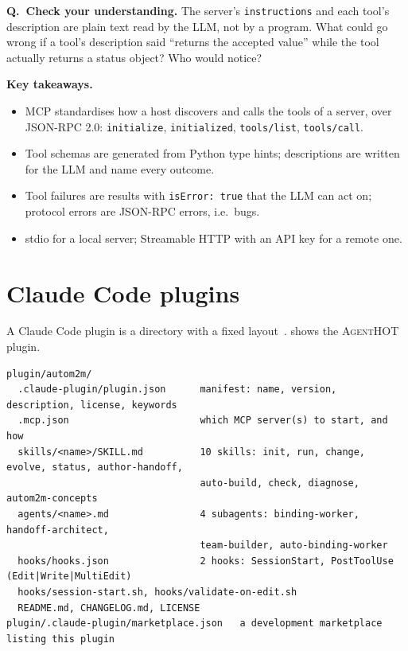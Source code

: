 \documentclass[10pt,a4paper]{article}
\newcommand{\tool}{\textsc{AgentHOT}}
\newcommand{\cc}{Claude Code}
\newcommand{\code}[1]{\texttt{#1}}
\newcommand{\file}[1]{\texttt{#1}}
\newcounter{think}
\newenvironment{think}[1][Check your understanding]{%
  \refstepcounter{think}%
  \begin{tcolorbox}[enhanced, breakable, colback=thinkbg, colframe=thinkbg, arc=0pt, boxrule=0pt,
     borderline west={2.2pt}{0pt}{thinkbar}, left=8pt, right=8pt, top=5pt, bottom=5pt,
     before skip=8pt, after skip=8pt]
  \textsf{\bfseries\color{thinkbar}Q\thethink.\ #1.}\enspace}{\end{tcolorbox}}
\newenvironment{takeaway}{%
  \begin{tcolorbox}[enhanced, breakable, colback=keybg, colframe=keybg, arc=0pt, boxrule=0pt,
     borderline west={2.2pt}{0pt}{keybar}, left=8pt, right=8pt, top=5pt, bottom=5pt,
     before skip=8pt, after skip=8pt]
  \textsf{\bfseries\color{keybar}Key takeaways.}\par\smallskip}{\end{tcolorbox}}
\begin{document}
\begin{think}
The server's \code{instructions} and each tool's description are plain
text read by the LLM, not by a program. What could go wrong if a tool's
description said ``returns the accepted value'' while the tool actually
returns a status object? Who would notice?
\end{think}

\begin{takeaway}
\begin{itemize}
\item MCP standardises how a host discovers and calls the tools of a server,
over JSON-RPC 2.0: \code{initialize}, \code{initialized},
\code{tools/list}, \code{tools/call}.
\item Tool schemas are generated from Python type hints; descriptions are
written for the LLM and name every outcome.
\item Tool failures are results with \code{isError: true} that the LLM can
act on; protocol errors are JSON-RPC errors, i.e.\ bugs.
\item stdio for a local server; Streamable HTTP with an API key for a
remote one.
\end{itemize}
\end{takeaway}

\section{\cc{} plugins}\label{sec:plugins}

A \cc{} plugin is a directory with a fixed layout~\cite{claudecodedocs}.
 shows the \tool{} plugin.

\begin{lstlisting}[style=raw, caption={Code excerpt: the layout of \file{plugin/autom2m/}, version 0.3.0.}, label={lst:tree}]
plugin/autom2m/
  .claude-plugin/plugin.json      manifest: name, version, description, license, keywords
  .mcp.json                       which MCP server(s) to start, and how
  skills/<name>/SKILL.md          10 skills: init, run, change, evolve, status, author-handoff,
                                  auto-build, check, diagnose, autom2m-concepts
  agents/<name>.md                4 subagents: binding-worker, handoff-architect,
                                  team-builder, auto-binding-worker
  hooks/hooks.json                2 hooks: SessionStart, PostToolUse (Edit|Write|MultiEdit)
  hooks/session-start.sh, hooks/validate-on-edit.sh
  README.md, CHANGELOG.md, LICENSE
plugin/.claude-plugin/marketplace.json   a development marketplace listing this plugin
\end{lstlisting}
\end{document}
